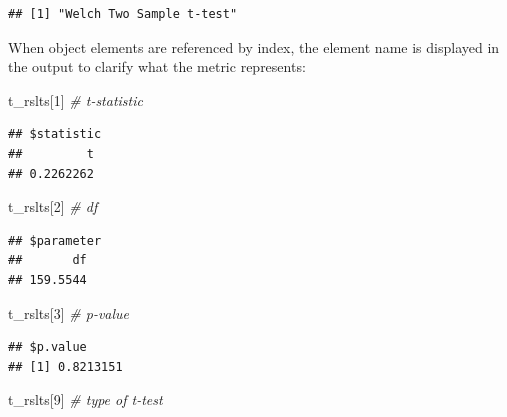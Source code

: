 \documentclass[]{book}
\newenvironment{Shaded}{\begin{snugshade}}{\end{snugshade}}
\newcommand{\CommentTok}[1]{\textcolor[rgb]{0.56,0.35,0.01}{\textit{#1}}}
\newcommand{\DecValTok}[1]{\textcolor[rgb]{0.00,0.00,0.81}{#1}}
\newcommand{\NormalTok}[1]{#1}
\newcommand{\OperatorTok}[1]{\textcolor[rgb]{0.81,0.36,0.00}{\textbf{#1}}}
\begin{document}
\begin{Shaded}
\end{Shaded}

\begin{verbatim}
## [1] "Welch Two Sample t-test"
\end{verbatim}

When object elements are referenced by index, the element name is displayed in the output to clarify what the metric represents:

\begin{Shaded}
\begin{Highlighting}[]
\NormalTok{t_rslts[}\DecValTok{1}\NormalTok{] }\CommentTok{# t-statistic}
\end{Highlighting}
\end{Shaded}

\begin{verbatim}
## $statistic
##         t 
## 0.2262262
\end{verbatim}

\begin{Shaded}
\begin{Highlighting}[]
\NormalTok{t_rslts[}\DecValTok{2}\NormalTok{] }\CommentTok{# df}
\end{Highlighting}
\end{Shaded}

\begin{verbatim}
## $parameter
##       df 
## 159.5544
\end{verbatim}

\begin{Shaded}
\begin{Highlighting}[]
\NormalTok{t_rslts[}\DecValTok{3}\NormalTok{] }\CommentTok{# p-value}
\end{Highlighting}
\end{Shaded}

\begin{verbatim}
## $p.value
## [1] 0.8213151
\end{verbatim}

\begin{Shaded}
\begin{Highlighting}[]
\NormalTok{t_rslts[}\DecValTok{9}\NormalTok{] }\CommentTok{# type of t-test}
\end{Highlighting}
\end{Shaded}
\end{document}

